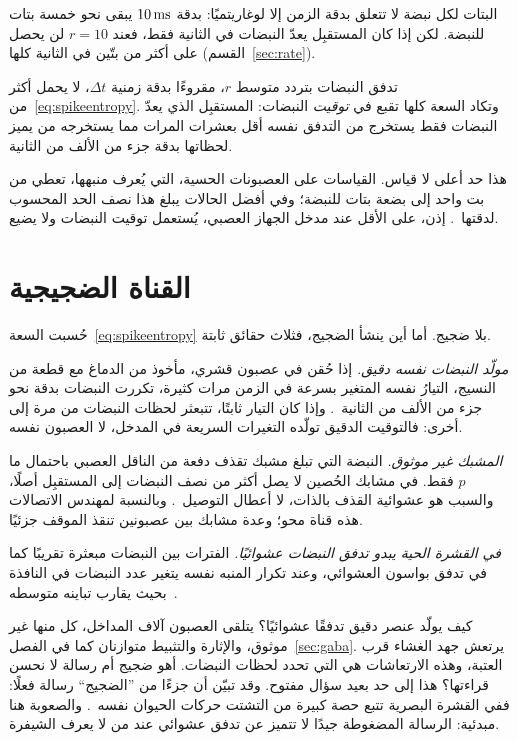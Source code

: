 البتات لكل نبضة لا تتعلق بدقة الزمن إلا لوغاريتميًا: بدقة $10\,\text{ms}$ يبقى نحو خمسة بتات للنبضة. لكن إذا كان المستقبِل يعدّ النبضات في الثانية فقط، فعند $r=10$ لن يحصل على أكثر من بتّين في الثانية كلها (القسم~\ref{sec:rate}).

\begin{keyblock}
\begin{proposition}
\label{prop:capacity}
تدفق النبضات بتردد متوسط $r$، مقروءًا بدقة زمنية $\Delta t$، لا يحمل أكثر من~\eqref{eq:spikeentropy}. وتكاد السعة كلها تقبع في \emph{توقيت} النبضات: المستقبِل الذي يعدّ النبضات فقط يستخرج من التدفق نفسه أقل بعشرات المرات مما يستخرجه من يميز لحظاتها بدقة جزء من الألف من الثانية.
\end{proposition}
\end{keyblock}

هذا حد أعلى لا قياس. القياسات على العصبونات الحسية، التي يُعرف منبهها، تعطي من بت واحد إلى بضعة بتات للنبضة؛ وفي أفضل الحالات يبلغ هذا نصف الحد المحسوب لدقتها~\cite{Rieke1997}. إذن، على الأقل عند مدخل الجهاز العصبي، يُستعمل توقيت النبضات ولا يضيع.

\section{القناة الضجيجية}

حُسبت السعة~\eqref{eq:spikeentropy} بلا ضجيج. أما أين ينشأ الضجيج، فثلاث حقائق ثابتة.

\emph{مولّد النبضات نفسه دقيق.} إذا حُقن في عصبون قشري، مأخوذ من الدماغ مع قطعة من النسيج، التيارُ نفسه المتغير بسرعة في الزمن مرات كثيرة، تكررت النبضات بدقة نحو جزء من الألف من الثانية~\cite{Mainen1995}. وإذا كان التيار ثابتًا، تتبعثر لحظات النبضات من مرة إلى أخرى: فالتوقيت الدقيق تولّده التغيرات السريعة في المدخل، لا العصبون نفسه.

\emph{المشبك غير موثوق.} النبضة التي تبلغ مشبك  تقذف دفعة من الناقل العصبي باحتمال ما $p$ فقط. في مشابك الحُصين لا يصل أكثر من نصف النبضات إلى المستقبِل أصلًا، والسبب هو عشوائية القذف بالذات، لا أعطال التوصيل~\cite{AllenStevens1994}. وبالنسبة لمهندس الاتصالات هذه قناة محو؛ وعدة مشابك بين عصبونين تنقذ الموقف جزئيًا.

\emph{في القشرة الحية يبدو تدفق النبضات عشوائيًا.} الفترات بين النبضات مبعثرة تقريبًا كما في تدفق بواسون العشوائي، وعند تكرار المنبه نفسه يتغير عدد النبضات في النافذة بحيث يقارب تباينه متوسطه~\cite{Softky1993}.

كيف يولّد عنصر دقيق تدفقًا عشوائيًا؟ يتلقى العصبون آلاف المداخل، كل منها غير موثوق، والإثارة والتثبيط متوازنان كما في الفصل~\ref{sec:gaba}. يرتعش جهد الغشاء قرب العتبة، وهذه الارتعاشات هي التي تحدد لحظات النبضات. أهو ضجيج أم رسالة لا نحسن قراءتها؟ هذا إلى حد بعيد سؤال مفتوح. وقد تبيّن أن جزءًا من ”الضجيج“ رسالة فعلًا: ففي القشرة البصرية تتبع حصة كبيرة من التشتت حركات الحيوان نفسه~\cite{Stringer2019}. والصعوبة هنا مبدئية: الرسالة المضغوطة جيدًا لا تتميز عن تدفق عشوائي عند من لا يعرف الشيفرة.

